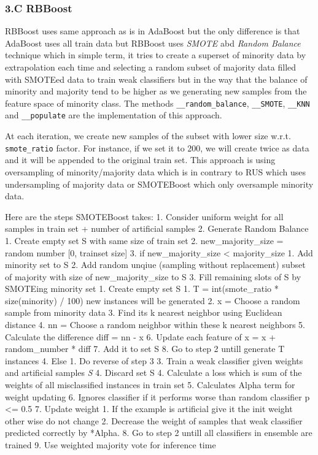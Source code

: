 \documentclass[11pt]{article}
\begin{document}
    \hypertarget{c-rbboost}{%
\subsubsection{3.C RBBoost}\label{c-rbboost}}

RBBoost uses same approach as is in AdaBoost but the only difference is
that AdaBoost uses all train data but RBBoost uses \emph{SMOTE} abd
\emph{Random Balance} technique which in simple term, it tries to create
a superset of minority data by extrapolation each time and selecting a
random subset of majority data filled with SMOTEed data to train weak
classifiers but in the way that the balance of minority and majority
tend to be higher as we generating new samples from the feature space of
minority class. The methods \texttt{\_\_random\_balance},
\texttt{\_\_SMOTE}, \texttt{\_\_KNN} and \texttt{\_\_populate} are the
implementation of this approach.

At each iteration, we create new samples of the subset with lower size
w.r.t. \texttt{smote\_ratio} factor. For instance, if we set it to 200,
we will create twice as data and it will be appended to the original
train set. This approach is using oversampling of minority/majority data
which is in contrary to RUS which uses undersampling of majority data or
SMOTEBoost which only oversample minority data.

Here are the steps SMOTEBoost takes: 1. Consider uniform weight for all
samples in train set + number of artificial samples 2. Generate Random
Balance 1. Create empty set S with same size of train set 2.
new\_majority\_size = random number {[}0, trainset size{]} 3. if
new\_majority\_size \textless{} majority\_size 1. Add minority set to S
2. Add random unqiue (sampling without replacement) subset of majority
with size of new\_majority\_size to S 3. Fill remaining slots of S by
SMOTEing minority set 1. Create empty set S 1. T = int(smote\_ratio *
size(minority) / 100) new instances will be generated 2. x = Choose a
random sample from minority data 3. Find its k nearest neighbor using
Euclidean distance 4. nn = Choose a random neighbor within these k
nearest neighbors 5. Calculate the difference diff = nn - x 6. Update
each feature of x = x + random\_number * diff 7. Add it to set S 8. Go
to step 2 untill generate T instances 4. Else 1. Do reverse of step 3 3.
Train a weak classifier given weights and artificial samples \emph{S} 4.
Discard set S 4. Calculate a loss which is sum of the weights of all
misclassified instances in train set 5. Calculates Alpha term for weight
updating 6. Ignores classifier if it performs worse than random
classifier p \textless{}= 0.5 7. Update weight 1. If the example is
artificial give it the init weight other wise do not change 2. Decrease
the weight of samples that weak classifier predicted correctly by
*Alpha. 8. Go to step 2 untill all classifiers in ensemble are trained
9. Use weighted majority vote for inference time
\end{document}
